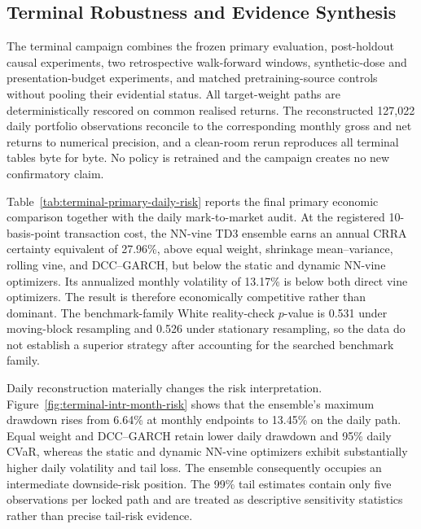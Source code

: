 \subsection{Terminal Robustness and Evidence Synthesis}
\label{subsec:terminal-robustness}

The terminal campaign combines the frozen primary evaluation, post-holdout causal experiments, two retrospective walk-forward windows, synthetic-dose and presentation-budget experiments, and matched pretraining-source controls without pooling their evidential status. All target-weight paths are deterministically rescored on common realised returns. The reconstructed 127,022 daily portfolio observations reconcile to the corresponding monthly gross and net returns to numerical precision, and a clean-room rerun reproduces all terminal tables byte for byte. No policy is retrained and the campaign creates no new confirmatory claim.

Table~\ref{tab:terminal-primary-daily-risk} reports the final primary economic comparison together with the daily mark-to-market audit. At the registered 10-basis-point transaction cost, the NN-vine TD3 ensemble earns an annual CRRA certainty equivalent of 27.96\%, above equal weight, shrinkage mean--variance, rolling vine, and DCC--GARCH, but below the static and dynamic NN-vine optimizers. Its annualized monthly volatility of 13.17\% is below both direct vine optimizers. The result is therefore economically competitive rather than dominant. The benchmark-family White reality-check $p$-value is 0.531 under moving-block resampling and 0.526 under stationary resampling, so the data do not establish a superior strategy after accounting for the searched benchmark family.

Daily reconstruction materially changes the risk interpretation. Figure~\ref{fig:terminal-intr-month-risk} shows that the ensemble's maximum drawdown rises from 6.64\% at monthly endpoints to 13.45\% on the daily path. Equal weight and DCC--GARCH retain lower daily drawdown and 95\% daily CVaR, whereas the static and dynamic NN-vine optimizers exhibit substantially higher daily volatility and tail loss. The ensemble consequently occupies an intermediate downside-risk position. The 99\% tail estimates contain only five observations per locked path and are treated as descriptive sensitivity statistics rather than precise tail-risk evidence.


